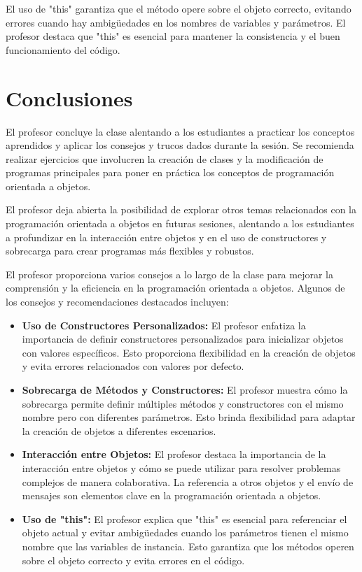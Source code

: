 \documentclass[a4paper]{report}
\begin{document}
El uso de "this" garantiza que el método opere sobre el objeto correcto, evitando errores cuando hay ambigüedades en los nombres de variables y parámetros. El profesor destaca que "this" es esencial para mantener la consistencia y el buen funcionamiento del código.

\section{Conclusiones}
El profesor concluye la clase alentando a los estudiantes a practicar los conceptos aprendidos y aplicar los consejos y trucos dados durante la sesión. Se recomienda realizar ejercicios que involucren la creación de clases y la modificación de programas principales para poner en práctica los conceptos de programación orientada a objetos.

El profesor deja abierta la posibilidad de explorar otros temas relacionados con la programación orientada a objetos en futuras sesiones, alentando a los estudiantes a profundizar en la interacción entre objetos y en el uso de constructores y sobrecarga para crear programas más flexibles y robustos.

El profesor proporciona varios consejos a lo largo de la clase para mejorar la comprensión y la eficiencia en la programación orientada a objetos. Algunos de los consejos y recomendaciones destacados incluyen:

\begin{itemize}
    \item \textbf{Uso de Constructores Personalizados:} El profesor enfatiza la importancia de definir constructores personalizados para inicializar objetos con valores específicos. Esto proporciona flexibilidad en la creación de objetos y evita errores relacionados con valores por defecto.
    \item \textbf{Sobrecarga de Métodos y Constructores:} El profesor muestra cómo la sobrecarga permite definir múltiples métodos y constructores con el mismo nombre pero con diferentes parámetros. Esto brinda flexibilidad para adaptar la creación de objetos a diferentes escenarios.
    \item \textbf{Interacción entre Objetos:} El profesor destaca la importancia de la interacción entre objetos y cómo se puede utilizar para resolver problemas complejos de manera colaborativa. La referencia a otros objetos y el envío de mensajes son elementos clave en la programación orientada a objetos.
    \item \textbf{Uso de "this":} El profesor explica que "this" es esencial para referenciar el objeto actual y evitar ambigüedades cuando los parámetros tienen el mismo nombre que las variables de instancia. Esto garantiza que los métodos operen sobre el objeto correcto y evita errores en el código.
\end{itemize}
\end{document}
